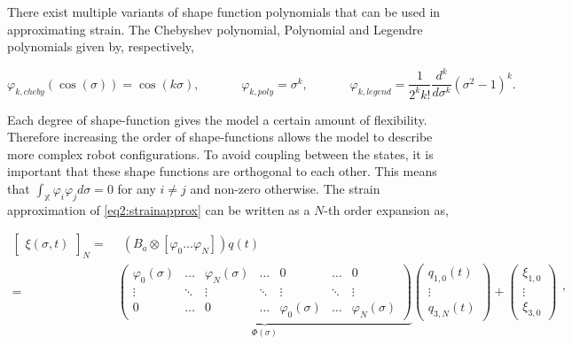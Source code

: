 There exist multiple variants of shape function polynomials that can be used in approximating strain. The Chebyshev polynomial, Polynomial and Legendre polynomials given by, respectively,

\begin{equation}
    \varphi_{k,cheby}(\cos(\sigma)) = \cos(k \sigma), \hspace{40pt} \varphi_{k,poly} = \sigma^k, \hspace{40pt} \varphi_{k,legend} = \frac{1}{2^k k!} \frac{d^k}{d\sigma^k}(\sigma^2-1)^k.
    \label{eq2:shapefunction}
\end{equation}


Each degree of shape-function gives the model a certain amount of flexibility. Therefore increasing the order of shape-functions allows the model to describe more complex robot configurations. To avoid coupling between the states, it is important that these shape functions are orthogonal to each other. This means that $\int_\mathbb{X} \varphi_i \varphi_j d \sigma = 0$ for any $i \neq j$ and non-zero otherwise. The strain approximation of \ref{eq2:strainapprox} can be written as a $N$-th order expansion as,



\begin{equation}
\begin{aligned}
    \begin{bmatrix}\xi(\sigma,t)\end{bmatrix}_N = & \hspace{5pt}  (B_a \otimes [ \varphi_0 \dots \varphi_N ])q(t)\\ = &  \underbrace{ \begin{pmatrix}
    \varphi_0(\sigma) & \dots  & \varphi_N(\sigma) & \dots     & 0      & \dots  &  0 \\
    \vdots    & \ddots & \vdots    & \ddots    & \vdots & \ddots & \vdots \\
    0         & \dots  & 0         & \dots     & \varphi_0(\sigma) & \dots & \varphi_N (\sigma)
    \end{pmatrix}}_{\Phi(\sigma)} \begin{pmatrix} q_{1,0}(t) \\ \vdots \\ q_{3,N}(t) \end{pmatrix} +  \begin{pmatrix} \xi_{1,0} \\ \vdots \\ \xi_{3,0}   \end{pmatrix}
    \end{aligned},
\label{eq2:xishape}
\end{equation}

